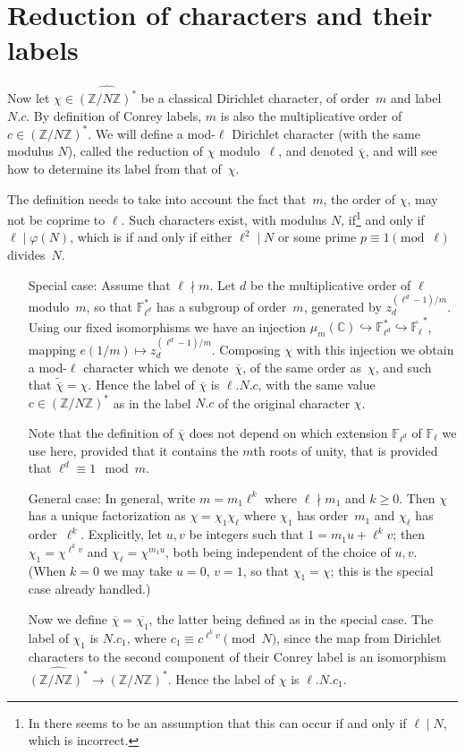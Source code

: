 \documentclass[a4paper, 10pt]{amsart}
\def\Z{{\mathbb Z}}
\def\C{{\mathbb C}}
\def\Fl{{\mathbb F}_{\ell}}
\def\Fld{{\mathbb F}_{\ell^d}}
\def\Flbar{\overline{{\mathbb F}_{\ell}}}
\def\ZNs{(\Z/N\Z)^*}
\def\ZNsh{\widehat{\ZNs}}
\newcommand{\CLab}[2]{$#1.#2$}
\newcommand{\DLab}[3]{$#1.#2.#3$}
\begin{document}
\section{Reduction of characters and their labels}

Now let $\chi\in\ZNsh$ be a classical Dirichlet character, of
order~$m$ and label \CLab{N}{c}.  By definition of Conrey labels, $m$
is also the multiplicative order of $c\in\ZNs$.  We will define a
mod-$\ell$ Dirichlet character (with the same modulus $N$), called the
reduction of $\chi$ modulo~$\ell$, and denoted $\overline{\chi}$, and
will see how to determine its label from that of~$\chi$.

The definition needs to take into account the fact that~$m$, the order
of $\chi$, may not be coprime to $\ell$.  Such characters exist, with
modulus $N$, if\footnote{In \cite{OldDef} there seems to be an
  assumption that this can occur if and only if $\ell\mid N$, which is
  incorrect.} and only if $\ell\mid\varphi(N)$, which is if and only
if either $\ell^2\mid N$ or some prime $p\equiv1\pmod{\ell}$
divides~$N$.

\begin{itemize}
  \item[Special case:] Assume that $\ell\nmid m$. Let $d$ be the
    multiplicative order of $\ell$ modulo~$m$, so that $\Fld^*$ has a
    subgroup of order~$m$, generated by $z_d^{(\ell^d-1)/m}$.  Using
    our fixed isomorphisms we have an injection
    $\mu_m(\C)\hookrightarrow\Fld^*\hookrightarrow\Flbar^*$, mapping
    $e(1/m)\mapsto z_d^{(\ell^d-1)/m}$.  Composing $\chi$ with this
    injection we obtain a mod-$\ell$ character which we
    denote~$\overline{\chi}$, of the same order as~$\chi$, and such
    that $\tilde{\overline{\chi}}=\chi$.  Hence the label of
    $\overline{\chi}$ is \DLab{\ell}{N}{c}, with the same value
    $c\in\ZNs$ as in the label \CLab{N}{c} of the original character
    $\chi$.

    Note that the definition of $\overline{\chi}$ does not depend on
    which extension $\Fld$ of $\Fl$ we use here, provided that it
    contains the $m$th roots of unity, that is provided that
    $\ell^d\equiv1\mod{m}$.

    \item[General case:] In general, write $m=m_1\ell^k$ where
      $\ell\nmid m_1$ and $k\ge0$.  Then $\chi$ has a unique
      factorization as $\chi=\chi_1\chi_{\ell}$ where $\chi_1$ has
      order~$m_1$ and $\chi_{\ell}$ has order~$\ell^k$.  Explicitly,
      let $u,v$ be integers such that $1=m_1u+\ell^kv$; then
      $\chi_1=\chi^{\ell^kv}$ and $\chi_{\ell}=\chi^{m_1u}$, both
      being independent of the choice of $u,v$.  (When $k=0$ we may
      take $u=0$, $v=1$, so that $\chi_1=\chi$; this is the special
      case already handled.)

      Now we define $\overline{\chi}=\overline{\chi_1}$, the latter
      being defined as in the special case.  The label of $\chi_1$ is
      \CLab{N}{c_1}, where $c_1\equiv c^{\ell^kv}\pmod{N}$, since the
      map from Dirichlet characters to the second component of their
      Conrey label is an isomorphism $\ZNsh\to\ZNs$.  Hence the label
      of $\chi$ is \DLab{\ell}{N}{c_1}.
\end{itemize}
\end{document}
